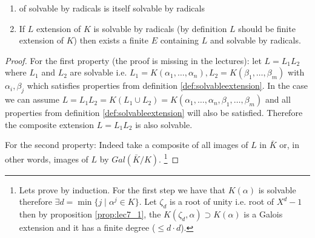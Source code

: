 \begin{property}
  \begin{enumerate}
  \item {} of solvable by radicals is itself
    solvable by radicals
  \item If $L$ extension of $K$ is solvable by radicals (by definition
    $L$ should be finite extension of $K$) then exists a finite
     $E$ containing $L$ and solvable by
    radicals.    
  \end{enumerate}
  \label{property:solvable}
  \begin{proof}
    For the first property (the proof is missing in the lectures): let
    $L = L_1 L_2$ where $L_1$ and $L_2$ are solvable i.e.
    $L_1 = K\left(\alpha_1, \dots, \alpha_n\right),
    L_2 = K\left(\beta_1, \dots, \beta_m\right)$ with $\alpha_i,
    \beta_j$ which satisfies properties from definition
    \ref{def:solvableextension}. In the case we can assume
    $L = L_1 L_2 = K\left(L_1 \cup L_2\right) = 
    K\left(\alpha_1, \dots, \alpha_n, \beta_1, \dots, \beta_m\right)$
    and all properties from definition
    \ref{def:solvableextension} will also be satisfied. Therefore
    the composite extension $L = L_1 L_2$ is also solvable.
    
    For the second property: Indeed take a composite of all images of $L$ in
    $\bar{K}$ or, in other words, images of $L$ by
    $Gal\left(\bar{K}/K\right)$.
    \footnote{
      Lets prove by induction. For the first step we have that
      $K\left(\alpha\right)$ is solvable therefore
      $\exists d = \min\{j \mid \alpha^j \in K\}$. Let
      $\zeta_d$ is a root of unity i.e. root of $X^d - 1$ then by
      proposition \ref{prop:lec7_1}, the
      $K\left(\zeta_d, \alpha\right) \supset K\left(\alpha\right)$ is
      a Galois extension and it has a finite degree ($\le d \cdot d$).

}
\end{proof}
\end{property}
